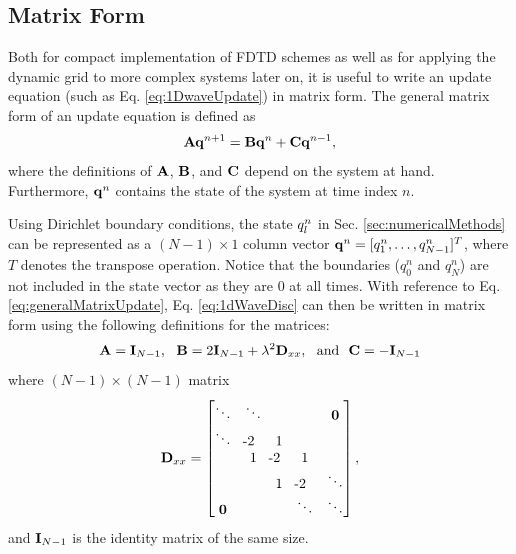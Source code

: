 \documentclass[fleqn]{jaes}
\def\SBcomment[#1]{\textcolor{red}{#1}}
\def\SWcomment[#1]{\textcolor{blue}{#1}}
\begin{document}
\subsection{Matrix Form}\label{sec:matrixFormOrig}
Both for compact implementation of FDTD schemes as well as for applying the dynamic grid to more complex systems later on, it is useful to write an update equation (such as Eq. \eqref{eq:1DwaveUpdate}) in matrix form. The general matrix form of an update equation is defined as
\begin{equation}\label{eq:generalMatrixUpdate}
    \A \q^{n+1} = \B \q^n + \C \q^{n-1},
\end{equation}
where the definitions of $\mathbf{A}$, $\mathbf{B}$, and $\mathbf{C}$ depend on the system at hand. Furthermore, $\mathbf{q}^n$ contains the state of the system at time index $n$. 

Using Dirichlet boundary conditions, the state $q_l^n$ in Sec. \ref{sec:numericalMethods} can be represented as a $(N-1) \times 1$ column vector $\mathbf{q}^n = [q_1^n, \hdots, q_{N-1}^n]^T$, where $T$ denotes the transpose operation. Notice that the boundaries ($q_0^n$ and $q_N^n$) are not included in the state vector as they are 0 at all times. With reference to Eq. \eqref{eq:generalMatrixUpdate}, Eq. \eqref{eq:1dWaveDisc} can then be written in matrix form using the following definitions for the matrices: 
\begin{equation}
    \A = \I_{N-1}, \ \ \B = 2 \I_{N-1} + \lambda^2 \Dxx, \ \ \text{and} \ \ \C = -\I_{N-1}
\end{equation}
where $(N-1)\times(N-1)$ matrix
\begin{equation}\label{eq:dxxMat}
    \Dxx =
    \begin{bmatrix}
        \ddots & \ddots & & &\mathbf{0}\\
        \ddots & \!\!\!\!$-2$ & 1 & & \\
        & 1 & \!\!\!\!$-2$ & 1 & \\
        & & 1 & \!\!\!\!$-2$ & \ddots \\
        \mathbf{0}& & & \ddots & \ddots 
    \end{bmatrix},
\end{equation}
and $\mathbf{I}_{N-1}$ is the identity matrix of the same size. 
\end{document}
